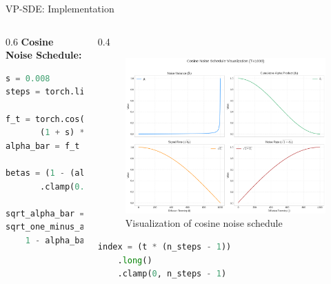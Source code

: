 \documentclass[10pt]{beamer}
\begin{document}
\begin{frame}[fragile]{VP-SDE: Implementation}
  \begin{columns}[T]
    \begin{column}{0.6\textwidth}
      \textbf{Cosine Noise Schedule:}
      \begin{lstlisting}[language=Python,
                            basicstyle=\ttfamily\tiny,
                            numbers=none,
                            frame=single]
s = 0.008
steps = torch.linspace(0, n_steps, n_steps + 1)

f_t = torch.cos(((steps / n_steps) + s) /
       (1 + s) * math.pi / 2) ** 2
alpha_bar = f_t / f_t[0]

betas = (1 - (alpha_bar[1:] / alpha_bar[:-1]))
       .clamp(0.0001, 0.9999)

sqrt_alpha_bar = torch.sqrt(alpha_bar[1:])
sqrt_one_minus_alpha_bar = torch.sqrt(
    1 - alpha_bar[1:])
      \end{lstlisting}
    \end{column}

    \begin{column}{0.4\textwidth}
      \vspace{0.5cm}
      \begin{figure}
          \centering
          \includegraphics[width=\linewidth]{cosine.png}
          \caption{Visualization of cosine noise schedule}

      \end{figure}

      \begin{lstlisting}[language=Python,
                            basicstyle=\ttfamily\tiny,
                            numbers=none,
                            frame=single]
index = (t * (n_steps - 1))
    .long()
    .clamp(0, n_steps - 1)
      \end{lstlisting}
    \end{column}
  \end{columns}
\end{frame}
\end{document}
